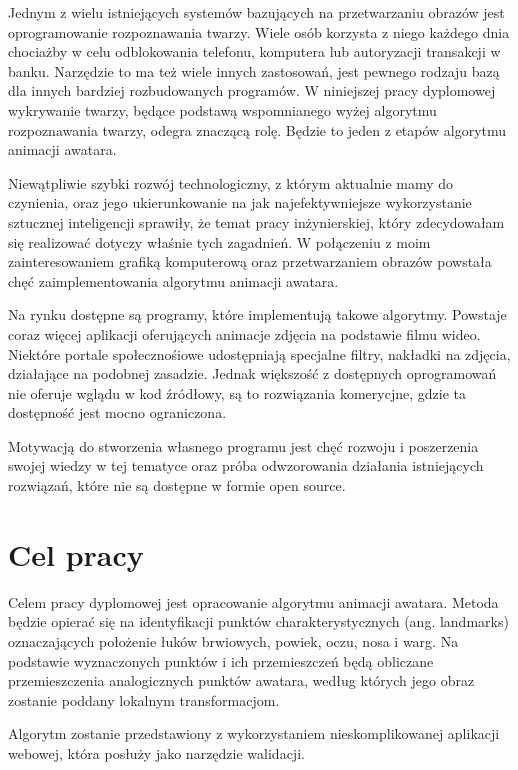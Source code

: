 Jednym z wielu istniejących systemów bazujących na przetwarzaniu obrazów jest oprogramowanie rozpoznawania twarzy. Wiele osób korzysta z niego każdego dnia chociażby w celu odblokowania telefonu, komputera lub autoryzacji transakcji w banku. Narzędzie to ma też wiele innych zastosowań, jest pewnego rodzaju bazą dla innych bardziej rozbudowanych programów. W niniejszej pracy dyplomowej wykrywanie twarzy, będące podstawą wspomnianego wyżej algorytmu rozpoznawania twarzy, odegra znaczącą rolę. Będzie to jeden z etapów algorytmu animacji awatara.

Niewątpliwie szybki rozwój technologiczny, z którym aktualnie mamy do czynienia, oraz jego ukierunkowanie na jak najefektywniejsze wykorzystanie sztucznej inteligencji sprawiły, że temat pracy inżynierskiej, który zdecydowałam się realizować dotyczy właśnie tych zagadnień. W połączeniu z moim zainteresowaniem grafiką komputerową oraz przetwarzaniem obrazów powstała chęć zaimplementowania algorytmu animacji awatara.

Na rynku dostępne są programy, które implementują takowe algorytmy. Powstaje coraz więcej aplikacji oferujących animacje zdjęcia na podstawie filmu wideo. Niektóre portale społecznośiowe udostępniają specjalne filtry, nakładki na zdjęcia, działające na podobnej zasadzie. Jednak większość z dostępnych oprogramowań nie oferuje wglądu w kod źródłowy, są to rozwiązania komerycjne, gdzie ta dostępność jest mocno ograniczona.

Motywacją do stworzenia własnego programu jest chęć rozwoju i poszerzenia swojej wiedzy w tej tematyce oraz próba odwzorowania działania istniejących rozwiązań, które nie są dostępne w formie open source. 



\section{Cel pracy}

Celem pracy dyplomowej jest opracowanie algorytmu animacji awatara. Metoda będzie opierać się na identyfikacji punktów charakterystycznych (ang. landmarks) oznaczających położenie łuków brwiowych, powiek, oczu, nosa i warg. Na podstawie wyznaczonych punktów i ich przemieszczeń będą obliczane przemieszczenia analogicznych punktów awatara, według których jego obraz zostanie poddany lokalnym transformacjom.

Algorytm zostanie przedstawiony z wykorzystaniem nieskomplikowanej aplikacji webowej, która posłuży jako narzędzie walidacji.

